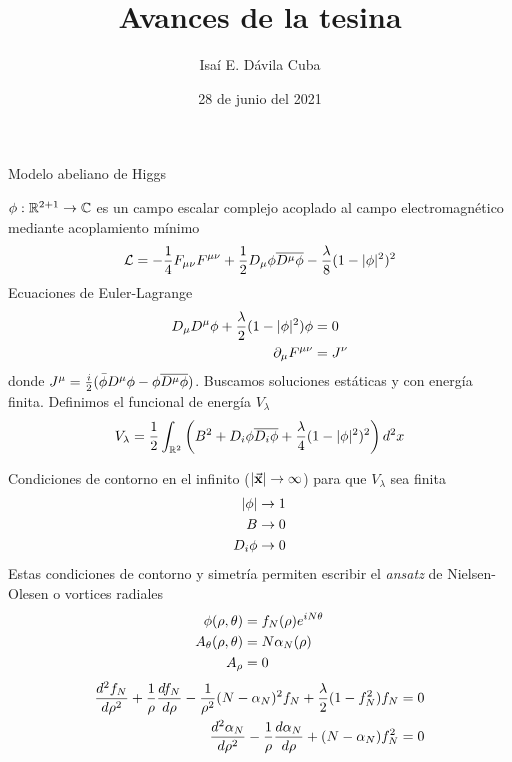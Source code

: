 \documentclass[11pt,t]{beamer}
\title{Avances de la tesina}
\author{Isaí E. Dávila Cuba}
\date{28 de junio del 2021}
\begin{document}
\begin{frame}
  \titlepage
\end{frame}

\begin{frame}{Modelo abeliano de Higgs}

$\phi:\mathbb{R}^{2+1}\rightarrow\mathbb{C}$ es un campo escalar complejo acoplado al campo electromagnético mediante acoplamiento mínimo
\begin{align}
    \mathcal{L} = -\frac{1}{4} F_{\mu\nu}F^{\mu\nu}+\frac{1}{2}D_\mu\phi\overline{D^\mu\phi}-\frac{\lambda}{8}(1-|\phi|^2)^2
\end{align}
Ecuaciones de Euler-Lagrange
\begin{align}
    D_\mu D^\mu\phi+\frac{\lambda}{2}(1-|\phi|^2)\phi &= 0\\
    \partial_\mu F^{\mu\nu} &= J^\nu
\end{align}
donde $J^\mu=\frac{i}{2}(\bar\phi D^\mu\phi-\phi\overline{D^\mu\phi})$.
Buscamos soluciones estáticas y con energía finita. Definimos el funcional de energía $V_\lambda$
\begin{align}
    V_\lambda = \frac{1}{2}\int_{\mathbb{R}^2}\left(B^2+D_i\phi\overline{D_i\phi}+\frac{\lambda}{4}(1-|\phi|^2)^2\right)d^2x
\end{align}

\end{frame}

\begin{frame}

Condiciones de contorno en el infinito ($|\vec{\mathbf{x}}|\rightarrow\infty$) para que $V_\lambda$ sea finita
\begin{align}
    |\phi|&\rightarrow 1\\
    B&\rightarrow 0\\
    D_i\phi &\rightarrow 0
\end{align}
Estas condiciones de contorno y simetría permiten escribir el \emph{ansatz} de Nielsen-Olesen o vortices radiales
\begin{align}
    \phi(\rho,\theta) &= f_N(\rho)e^{iN\theta}\\
    A_\theta(\rho,\theta) &= N\alpha_N(\rho)\\
    A_\rho &= 0
\end{align}
\begin{align}
    \frac{d^2f_N}{d\rho^2}+\frac{1}{\rho}\frac{df_N}{d\rho}-\frac{1}{\rho^2}(N-\alpha_N)^2 f_N+\frac{\lambda}{2}(1-f_N^2)f_N &=0\\
    \frac{d^2\alpha_N}{d\rho^2}-\frac{1}{\rho}\frac{d\alpha_N}{d\rho}+(N-\alpha_N)f_N^2 &= 0
\end{align}
    
\end{frame}
\end{document}
